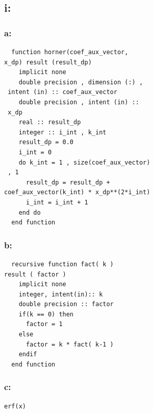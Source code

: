 \documentclass[twocolumn]{article}
\begin{document}
\subsection{i:}														
\subsubsection{a:}		
\begin{verbatim}
  function horner(coef_aux_vector, 
x_dp) result (result_dp)
    implicit none
    double precision , dimension (:) ,
 intent (in) :: coef_aux_vector
    double precision , intent (in) ::
 x_dp
    real :: result_dp
    integer :: i_int , k_int
    result_dp = 0.0
    i_int = 0
    do k_int = 1 , size(coef_aux_vector)
 , 1
      result_dp = result_dp + 
coef_aux_vector(k_int) * x_dp**(2*i_int)
      i_int = i_int + 1
    end do
  end function
\end{verbatim}
\subsubsection{b:}
\begin{verbatim}
  recursive function fact( k ) 
result ( factor )
    implicit none
    integer, intent(in):: k
    double precision :: factor
    if(k == 0) then
      factor = 1
    else
      factor = k * fact( k-1 )
    endif
  end function
\end{verbatim}
\subsubsection{c:}	
\begin{verbatim}
erf(x)
\end{verbatim}									%
\end{document}
